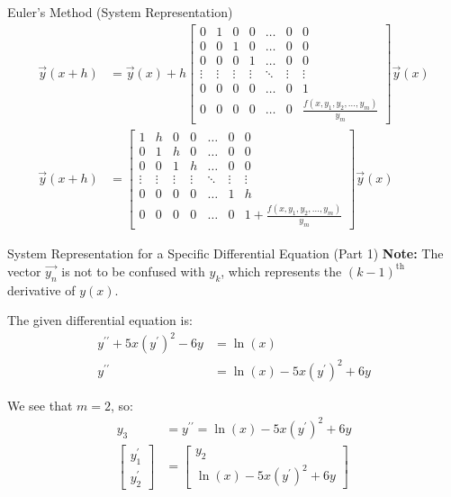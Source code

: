 \documentclass{beamer}
\begin{document}
\begin{frame}{Euler's Method (System Representation)}
\begin{align}
    \vec{y}(x+h) 
    &=
    \vec{y}(x) 
    +
    h
    \begin{bmatrix}
        0 & 1 & 0 & 0 & \dots & 0 & 0 \\
        0 & 0 & 1 & 0 & \dots & 0 & 0 \\
        0 & 0 & 0 & 1 & \dots & 0 & 0 \\
        \vdots & \vdots & \vdots & \vdots & \ddots & \vdots & \vdots \\
        0 & 0 & 0 & 0 & \dots & 0 & 1 \\
        0 & 0 & 0 & 0 & \dots & 0 & \frac{f(x, y_1, y_2, \dots, y_m)}{y_m}
    \end{bmatrix}
    \vec{y}(x) \\
    \vec{y}(x+h) 
    &=
    \begin{bmatrix}
        1 & h & 0 & 0 & \dots & 0 & 0 \\
        0 & 1 & h & 0 & \dots & 0 & 0 \\
        0 & 0 & 1 & h & \dots & 0 & 0 \\
        \vdots & \vdots & \vdots & \vdots & \ddots & \vdots & \vdots \\
        0 & 0 & 0 & 0 & \dots & 1 & h \\
        0 & 0 & 0 & 0 & \dots & 0 & 1+\frac{f(x, y_1, y_2, \dots, y_m)}{y_m}
    \end{bmatrix}
    \vec{y}(x)
\end{align}
\end{frame}
\begin{frame}{System Representation for a Specific Differential Equation (Part 1)}
\textbf{Note:} The vector $\vec{y_n}$ is not to be confused with $y_k$, which represents the $(k-1)^{\text{th}}$ derivative of $y(x)$.

\medskip

The given differential equation is:
\begin{align}
    y^{\prime\prime} + 5x(y^{\prime})^2 - 6y &= \ln(x) \\
    y^{\prime\prime} &= \ln(x) - 5x(y^{\prime})^2 + 6y
\end{align}

We see that $m = 2$, so:
\begin{align}
    y_3 &= y^{\prime\prime} = \ln(x) - 5x(y^{\prime})^2 + 6y \\
    \begin{bmatrix}
        y_1^{\prime} \\ 
        y_2^{\prime}
    \end{bmatrix}
    &=
    \begin{bmatrix}
        y_2 \\ 
        \ln(x) - 5x(y^{\prime})^2 + 6y
    \end{bmatrix}
\end{align}
\end{frame}
\end{document}
